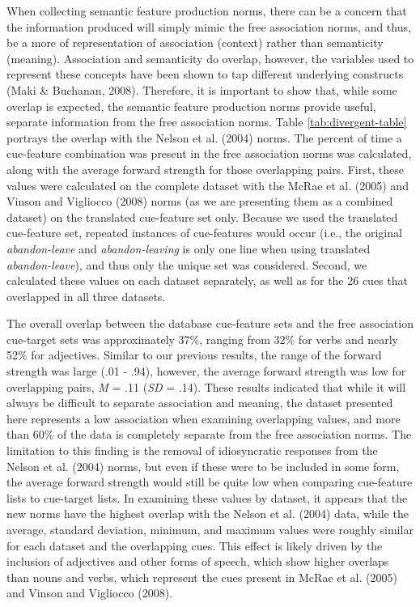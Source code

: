 \documentclass[english,,man]{apa6}
\begin{document}
When collecting semantic feature production norms, there can be a concern that the information produced will simply mimic the free association norms, and thus, be a more of representation of association (context) rather than semanticity (meaning). Association and semanticity do overlap, however, the variables used to represent these concepts have been shown to tap different underlying constructs (Maki \& Buchanan, 2008). Therefore, it is important to show that, while some overlap is expected, the semantic feature production norms provide useful, separate information from the free association norms. Table \ref{tab:divergent-table} portrays the overlap with the Nelson et al. (2004) norms. The percent of time a cue-feature combination was present in the free association norms was calculated, along with the average forward strength for those overlapping pairs. First, these values were calculated on the complete dataset with the McRae et al. (2005) and Vinson and Vigliocco (2008) norms (as we are presenting them as a combined dataset) on the translated cue-feature set only. Because we used the translated cue-feature set, repeated instances of cue-features would occur (i.e., the original \emph{abandon-leave} and \emph{abandon-leaving} is only one line when using translated \emph{abandon-leave}), and thus only the unique set was considered. Second, we calculated these values on each dataset separately, as well as for the 26 cues that overlapped in all three datasets.

The overall overlap between the database cue-feature sets and the free association cue-target sets was approximately 37\%, ranging from 32\% for verbs and nearly 52\% for adjectives. Similar to our previous results, the range of the forward strength was large (.01 - .94), however, the average forward strength was low for overlapping pairs, \emph{M} = .11 (\emph{SD} = .14). These results indicated that while it will always be difficult to separate association and meaning, the dataset presented here represents a low association when examining overlapping values, and more than 60\% of the data is completely separate from the free association norms. The limitation to this finding is the removal of idiosyncratic responses from the Nelson et al. (2004) norms, but even if these were to be included in some form, the average forward strength would still be quite low when comparing cue-feature lists to cue-target lists. In examining these values by dataset, it appears that the new norms have the highest overlap with the Nelson et al. (2004) data, while the average, standard deviation, minimum, and maximum values were roughly similar for each dataset and the overlapping cues. This effect is likely driven by the inclusion of adjectives and other forms of speech, which show higher overlaps than nouns and verbs, which represent the cues present in McRae et al. (2005) and Vinson and Vigliocco (2008).
\end{document}
